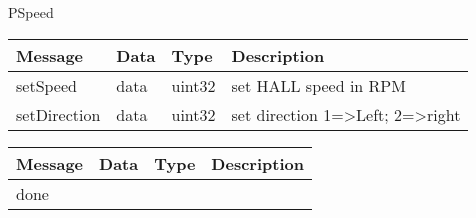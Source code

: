  {PSpeed}

\begin{tabular}[ht]{|l|l|l|p{8cm}|}
\hline
Message & Data & Type & Description\\
\hline
setSpeed &  data  &  uint32  & %
set HALL speed in RPM
\\
\hline
setDirection &  data  &  uint32  & %
set direction 1=>Left; 2=>right
\\
\hline
\end{tabular}
\begin{tabular}[ht]{|l|l|l|p{8cm}|}
\hline
Message & Data & Type & Description\\
\hline
done &  &  & \\
\hline
\end{tabular}
